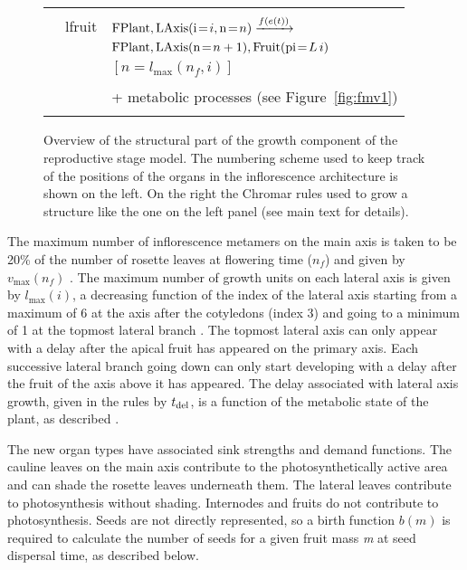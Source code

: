 \begin{figure}[p]
{\begin{tabularx}{1.05\textwidth}{c|ll}
\addlinespace[-0.15cm]
& & \\
& \textsf{lfruit} & $\mathrm{FPlant}, \mathrm{LAxis}(\mathrm{i} \! = \! {i}, \mathrm{n} \! = \! {n}) \xrightarrow{f(e(t))}$ \\
& & $\mathrm{FPlant}, \mathrm{LAxis}(\mathrm{n} \! = \! {n+1}), \mathrm{Fruit}(\mathrm{pi} \! = \! {L \, i})$ \\
& & $[n = l_{\mathrm{max}}(n_f, i)]$ \\
& & \\
& & + metabolic processes (see Figure~\ref{fig:fmv1}) \\
\addlinespace[0.25cm]
\bottomrule
\end{tabularx}}
\caption{Overview of the structural part of the growth component of the
  reproductive stage model. The numbering scheme used to keep track of the
  positions of the organs in the inflorescence architecture is shown on the
  left. On the right the Chromar rules used to grow a structure like the one on
  the left panel (see main text for details).}
\label{fig:reprModel}
\end{figure}

The maximum number of inflorescence metamers on the main axis is taken to be
20\% of the number of rosette leaves at flowering time (\(n_{f}\)) and given by
\(v_{\max}(n_{f})\) \citep{pouteau_significance_2009}. The maximum number of
growth units on each lateral axis is given by \(l_{\max}(i)\), a decreasing
function of the index of the lateral axis starting from a maximum of 6 at the
axis after the cotyledons (index 3) and going to a minimum of 1 at the topmost
lateral branch \citep{mundermann_quantitative_2005}. The topmost lateral axis
can only appear with a delay after the apical fruit has appeared on the primary
axis. Each successive lateral branch going down can only start developing with a
delay after the fruit of the axis above it has appeared. The delay associated
with lateral axis growth, given in the rules by \(t_{\mathrm{del}}\), is a function
of the metabolic state of the plant, as described
\citep{christophe_model-based_2008}.


The new organ types have associated sink strengths and demand functions.  The
cauline leaves on the main axis contribute to the photosynthetically active area
and can shade the rosette leaves underneath them. The lateral leaves contribute
to photosynthesis without shading. Internodes and fruits do not contribute to
photosynthesis. Seeds are not directly represented, so a birth function \(b(m)\)
is required to calculate the number of seeds for a given fruit mass \emph{m} at
seed dispersal time, as described below.

